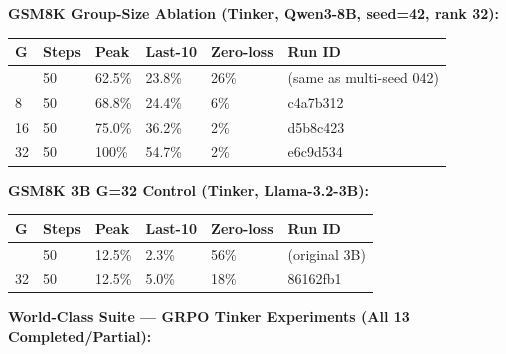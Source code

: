\documentclass[
  american,
  11pt,
  a4paper,
  oneside]{report}
\newcounter{none} %
\begin{document}
\textbf{GSM8K Group-Size Ablation (Tinker, Qwen3-8B, seed=42, rank 32):}

{\def\LTcaptype{none} %
\begin{longtable}[]{@{}llllll@{}}
\toprule\noalign{}
G & Steps & Peak & Last-10 & Zero-loss & Run ID \\
\midrule\noalign{}
\endhead
\bottomrule\noalign{}
\endlastfoot
4 & 50 & 62.5\% & 23.8\% & 26\% & (same as multi-seed 042) \\
8 & 50 & 68.8\% & 24.4\% & 6\% & c4a7b312 \\
16 & 50 & 75.0\% & 36.2\% & 2\% & d5b8c423 \\
32 & 50 & 100\% & 54.7\% & 2\% & e6c9d534 \\
\end{longtable}
}

\textbf{GSM8K 3B G=32 Control (Tinker, Llama-3.2-3B):}

{\def\LTcaptype{none} %
\begin{longtable}[]{@{}llllll@{}}
\toprule\noalign{}
G & Steps & Peak & Last-10 & Zero-loss & Run ID \\
\midrule\noalign{}
\endhead
\bottomrule\noalign{}
\endlastfoot
4 & 50 & 12.5\% & 2.3\% & 56\% & (original 3B) \\
32 & 50 & 12.5\% & 5.0\% & 18\% & 86162fb1 \\
\end{longtable}
}

\textbf{World-Class Suite --- GRPO Tinker Experiments (All 13
Completed/Partial):}
\end{document}
